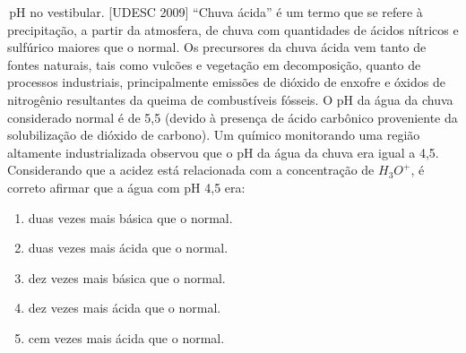 \begin{task}{\,pH no vestibular.}
[UDESC 2009] “Chuva ácida” é um termo que se refere à precipitação, a partir da
atmosfera, de chuva com quantidades de ácidos nítricos e sulfúrico maiores que o
normal. Os precursores da chuva ácida vem tanto de fontes naturais, tais como vulcões
e vegetação em decomposição, quanto de processos industriais, principalmente
emissões de dióxido de enxofre e óxidos de nitrogênio resultantes da queima de
combustíveis fósseis. O pH da água da chuva considerado normal é de 5,5 (devido
à presença de ácido carbônico proveniente da solubilização de dióxido de carbono).
Um químico monitorando uma região altamente industrializada observou que o pH da
água da chuva era igual a 4,5. Considerando que a acidez está relacionada com a
concentração de $H_3O^+$, é correto afirmar que a água com pH 4,5 era:
\begin{enumerate}[itemsep=0pt]
\item duas vezes mais básica que o normal.
\item duas vezes mais ácida que o normal.
\item dez vezes mais básica que o normal.
\item dez vezes mais ácida que o normal.
\item cem vezes mais ácida que o normal.
\end{enumerate}
\end{task}

\clearmargin

\exercise

